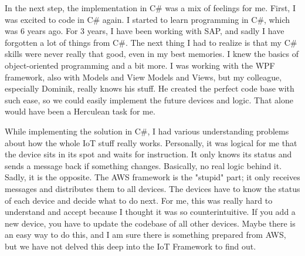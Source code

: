 In the next step, the implementation in C\# was a mix of feelings for me. 
First, I was excited to code in C\# again. 
I started to learn programming in C\#, which was 6 years ago. 
For 3 years, I have been working with SAP, and sadly I have forgotten a lot of things from C\#. 
The next thing I had to realize is that my C\# skills were never really that good, even in my best memories. 
I knew the basics of object-oriented programming and a bit more. 
I was working with the WPF framework, also with Models and View Models and Views, but my colleague, especially Dominik, really knows his stuff. 
He created the perfect code base with such ease, so we could easily implement the future devices and logic. 
That alone would have been a Herculean task for me.

While implementing the solution in C\#, I had various understanding problems about how the whole IoT stuff really works. 
Personally, it was logical for me that the device sits in its spot and waits for instruction. 
It only knows its status and sends a message back if something changes. 
Basically, no real logic behind it. Sadly, it is the opposite. 
The AWS framework is the "stupid" part; it only receives messages and distributes them to all devices.
The devices have to know the status of each device and decide what to do next. 
For me, this was really hard to understand and accept because I thought it was so counterintuitive. 
If you add a new device, you have to update the codebase of all other devices. 
Maybe there is an easy way to do this, and I am sure there is something prepared from AWS, but we have not delved this deep into the IoT Framework to find out.